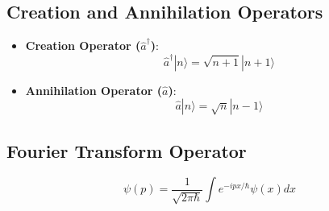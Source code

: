 \documentclass{article}
\theoremstyle{plain}
\begin{document}
\subsection{Creation and Annihilation Operators}
\begin{itemize}
    \item \textbf{Creation Operator (\(\hat{a}^\dagger\))}:
    \[
    \hat{a}^\dagger |n\rangle = \sqrt{n+1} |n+1\rangle
    \]

    \item \textbf{Annihilation Operator (\(\hat{a}\))}:
    \[
    \hat{a} |n\rangle = \sqrt{n} |n-1\rangle
    \]
\end{itemize}

\subsection{Fourier Transform Operator}
\[
\psi(p) = \frac{1}{\sqrt{2\pi \hbar}} \int e^{-ipx/\hbar} \psi(x) dx
\]
\end{document}
